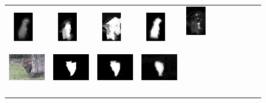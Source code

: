 \documentclass[10pt,twocolumn,letterpaper]{article}
\begin{document}
\begin{figure}
\begin{tabular}{@{}c@{}c@{}c@{}c@{}c@{}c@{}c@{}c@{}c@{}c@{}c}
\includegraphics[width=0.085\linewidth,height=1.25cm]{0234_DS.png} \ &
\includegraphics[width=0.085\linewidth,height=1.25cm]{0234_LEGS.png} \ &
\includegraphics[width=0.085\linewidth,height=1.25cm]{0234_MDF.png} \ &
\includegraphics[width=0.085\linewidth,height=1.25cm]{0234_ELD.png} \ &
\includegraphics[width=0.085\linewidth,height=1.25cm]{0234_DRFI.png} \ \\
\vspace{-1mm}
\includegraphics[width=0.085\linewidth,height=1.25cm]{0216.jpg} \ &
\includegraphics[width=0.085\linewidth,height=1.25cm]{gt0216.png} \ &
\includegraphics[width=0.085\linewidth,height=1.25cm]{0216_Amulet.png} \ &
\includegraphics[width=0.085\linewidth,height=1.25cm]{0216_RFCN.jpg} \ &

\end{tabular}
\end{figure}
\end{document}
